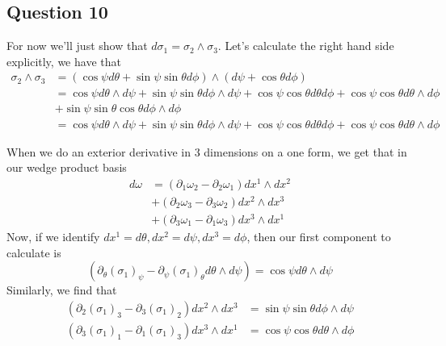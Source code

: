 \subsection{Question 10} 
For now we'll just show that $ d\sigma _ 1  = \sigma_2 \wedge  \sigma_3$. 
Let's calculate the right hand side explicitly, we have that
\begin{align*}
	\sigma_2 \wedge  \sigma_3 & = ( \cos \psi d \theta + \sin \psi \sin \theta d \phi ) \wedge ( d \psi + \cos \theta d \phi )  \\
	&=  \cos \psi d \theta \wedge  d \psi + \sin \psi \sin \theta d \phi \wedge  d \psi + \cos \psi \cos \theta d \theta d \phi + \cos \psi \cos \theta d \theta \wedge  d \phi \\ 
	& + \sin \psi \sin \theta \cos \theta d \phi \wedge  d \phi \\
	&=  \cos \psi d \theta \wedge  d \psi + \sin \psi \sin \theta d \phi \wedge  d \psi + \cos \psi \cos \theta d \theta d \phi + \cos \psi \cos \theta d \theta \wedge  d \phi 
\end{align*}

When we do an exterior derivative in 3 dimensions on a one form, 
we get that in our wedge product basis
\begin{align*}
	d \omega & = ( \partial_ 1 \omega _ 2 - \partial  _ 2 \omega_1 ) d x^ 1 \wedge  dx^ 2 \\
		 & + ( \partial _ 2 \omega_3 - \partial  _ 3 \omega _ 2 ) dx^ 2 \wedge  dx^ 3  \\
		 & + ( \partial  _ 3 \omega_1 - \partial  _ 1 \omega_3 ) dx ^ 3 \wedge  dx ^ 1
\end{align*}
Now, if we identify $d x^ 1 = d \theta, dx^ 2 = d \psi , dx^ 3 = d \phi $, 
then our first component to calculate is 
 \[
	 (  \partial  _{ \theta }  ( \sigma_1)   _{ \psi } - \partial  _{ \psi } ( \sigma_1 )_{ \theta } d \theta \wedge  d \psi )  = \cos \psi d \theta \wedge  d \psi 
\] Similarly, we find that 
\begin{align*}
	( \partial_2 ( \sigma_{1} ) _ 3 - \partial _ 3 ( \sigma_{ 1 }) _ 2 ) dx^ 2 \wedge  dx^ 3 & = \sin \psi \sin \theta d \phi \wedge  d\psi  \\
	( \partial _ 3 ( \sigma_1 ) _{ 1 } - \partial  _ 1 ( \sigma_ 1 ) _ 3 ) dx^ 3 \wedge  dx ^ 1 &=  \cos \psi \cos \theta d \theta \wedge  d \phi \\
\end{align*}

